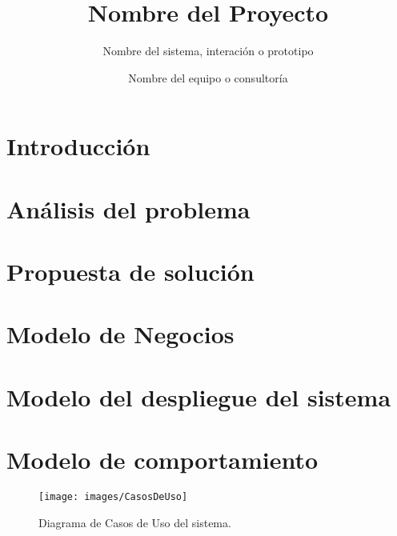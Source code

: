 \documentclass[oneside,10pt]{book}
\title{Nombre del Proyecto}
\subtitle{Nombre del sistema, interación o prototipo}
\author{Nombre del equipo o consultoría}
\begin{document}
\maketitle
\thispagestyle{empty}

\frontmatter
\tableofcontents

\mainmatter

\chapter{Introducción}


\chapter{Análisis del problema}


\chapter{Propuesta de solución}




\chapter{Modelo de Negocios}


\chapter{Modelo del despliegue del sistema}

\chapter{Modelo de comportamiento}
	
	\begin{figure}[htbp!]
		\centering
			\texttt{[image: images/CasosDeUso]}
		\caption{Diagrama de Casos de Uso del sistema.}
	\end{figure}
	
\end{document}
